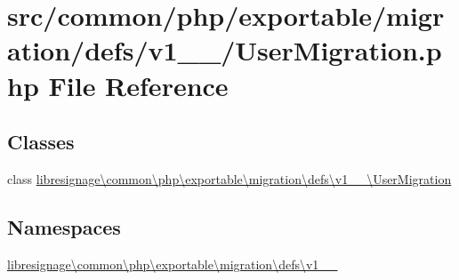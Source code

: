 \hypertarget{v1__0__0_2UserMigration_8php}{}\section{src/common/php/exportable/migration/defs/v1\+\_\+\_/\+User\+Migration.php File Reference}
\label{v1__0__0_2UserMigration_8php}
\subsection*{Classes}
\begin{DoxyCompactItemize}
\item 
class \hyperlink{classlibresignage_1_1common_1_1php_1_1exportable_1_1migration_1_1defs_1_1v1__0__0_1_1UserMigration}{libresignage\textbackslash{}common\textbackslash{}php\textbackslash{}exportable\textbackslash{}migration\textbackslash{}defs\textbackslash{}v1\+\_\+\_\textbackslash{}\+User\+Migration}
\end{DoxyCompactItemize}
\subsection*{Namespaces}
\begin{DoxyCompactItemize}
\item 
 \hyperlink{namespacelibresignage_1_1common_1_1php_1_1exportable_1_1migration_1_1defs_1_1v1__0__0}{libresignage\textbackslash{}common\textbackslash{}php\textbackslash{}exportable\textbackslash{}migration\textbackslash{}defs\textbackslash{}v1\+\_\+\_}
\end{DoxyCompactItemize}
